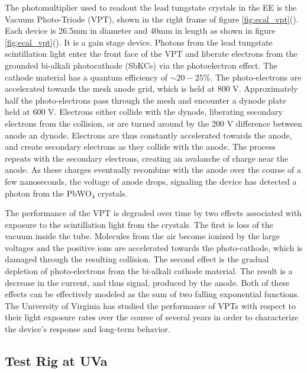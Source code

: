 \par The photomultiplier used to readout the lead tungstate crystals in
the EE is the Vacuum Photo-Triode (VPT), shown in the right frame of
figure \ref{fig:ecal_vpt}().  Each device is
26.5mm in diameter and 40mm in length as shown in figure
\ref{fig:ecal_vpt}().  It is a gain
stage device.  Photons from the lead tungstate scintillation light
enter the front face of the VPT and liberate electrons from the
grounded bi-alkali photocathode (SbKCs) via the photoelectron effect.
The cathode material has a quantum efficiency of $\sim20-25\%$.  The
photo-electrons are accelerated towards the mesh anode grid, which is
held at 800 V.  Approximately half the photo-electrons pass through
the mesh and encounter a dynode plate held at 600 V.  Electrons either
collide with the dynode, liberating secondary electrons from the
collision, or are turned around by the 200 V difference between anode
an dynode.  Electrons are thus constantly accelerated towards the
anode, and create secondary electrons as they collide with the anode.
The process repeats with the secondary electrons, creating an
avalanche of charge near the anode.  As these charges eventually
recombine with the anode over the course of a few nanoseconds, the
voltage of anode drops, signaling the device has detected a photon
from the PbWO$_{4}$ crystals.  

\par  The performance of the VPT is degraded over time by two effects
associated with exposure to the scintillation light from the crystals.
The first is loss of the vacuum inside the tube.  Molecules from the
air become ionized by the large voltages and the positive ions are
accelerated towards the photo-cathode, which is damaged through the
resulting collision.  The second effect is the gradual depletion of
photo-electrons from the bi-alkali cathode material.  The result is a
decrease in the current, and thus signal, produced by the anode.  Both
of these effects can be effectively modeled as the sum of two falling
exponential functions.  The University of Virginia has studied the
performance of VPTs with respect to their light exposure rates over
the course of several years in order to characterize the device's
response and long-term behavior.   


\subsection{Test Rig at UVa}
\label{vpt_test_rig_description}

